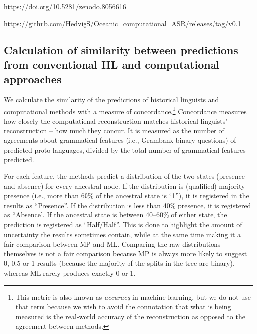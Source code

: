 \documentclass[12pt,letterpaper]{article}
\begin{document}
\url{https://doi.org/10.5281/zenodo.8056616}

\url{https://github.com/HedvigS/Oceanic_computational_ASR/releases/tag/v0.1}

 \FloatBarrier
\subsection{Calculation of similarity between predictions from conventional HL and computational approaches}
\label{result_calc_section}
We calculate the similarity of the predictions of historical linguists and computational methods with a measure of concordance.\footnote{This metric is also known as \textit{accuracy} in machine learning, but we do not use that term because we wish to avoid the connotation that what is being measured is the real-world accuracy of the reconstruction as opposed to the agreement between methods.} Concordance measures how closely the computational reconstruction matches historical linguists' reconstruction -- how much they concur. It is measured as the number of agreements about grammatical features (i.e., Grambank binary questions) of predicted proto-languages, divided by the total number of grammatical features predicted. 


For each feature, the methods predict a distribution of the two states (presence and absence) for every ancestral node. If the distribution is (qualified) majority presence (i.e., more than 60\% of the ancestral state is ``1''), it is registered in the results as ``Presence''. If the distribution is less than 40\% presence, it is registered as ``Absence''. If the ancestral state is between 40--60\% of either state, the prediction is registered as ``Half/Half''. This is done to highlight the amount of uncertainty the results sometimes contain, while at the same time making it a fair comparison between MP and ML. Comparing the raw distributions themselves is not a fair comparison because MP is always more likely to suggest 0, 0.5 or 1 results (because the majority of the splits in the tree are binary), whereas ML rarely produces exactly 0 or 1. 
\end{document}
